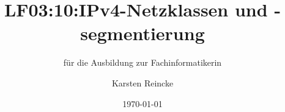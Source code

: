 \documentclass[]{beamer}
\title{LF03:10:IPv4-Netzklassen und -segmentierung}
\subtitle{für die Ausbildung zur Fachinformatikerin}
\institute[GS-LDK]{Gewerbliche Schulen Dillenburg}
\author{Karsten Reincke}
\date{\today}
\def\cfgGl{../../../cfg.gl/}
\begin{document}

\begin{frame}
  \titlepage

  
\end{frame}






\logo{}
\newpage



%
\end{document}
